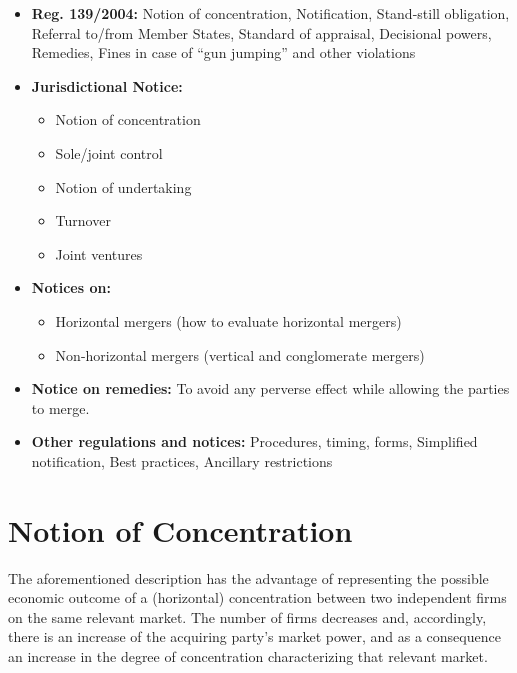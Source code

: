 \begin{itemize}
    \item \textbf{Reg. 139/2004:} Notion of concentration, Notification, Stand-still obligation, Referral to/from Member States, Standard of appraisal, Decisional powers, Remedies, Fines in case of “gun jumping” and other violations

    \item \textbf{Jurisdictional Notice:}
    \begin{itemize}
        \item Notion of concentration
        \item Sole/joint control
        \item Notion of undertaking
        \item Turnover
        \item Joint ventures
    \end{itemize}
    \item \textbf{Notices on:}
    \begin{itemize}
        \item Horizontal mergers (how to evaluate horizontal mergers)
        \item Non-horizontal mergers (vertical and conglomerate mergers)
    \end{itemize}
    \item \textbf{Notice on remedies:} To avoid any perverse effect while allowing the parties to merge.
    \item \textbf{Other regulations and notices:} Procedures, timing, forms, Simplified notification, Best practices, Ancillary restrictions
\end{itemize}

\newpage
\section{Notion of Concentration}


    The aforementioned description has the advantage of representing the possible economic outcome of a (horizontal) concentration between two independent firms on the same relevant market. The number of firms decreases and, accordingly, there is an increase of the acquiring party’s market power, and as a consequence an increase in the degree of concentration characterizing that relevant market.

